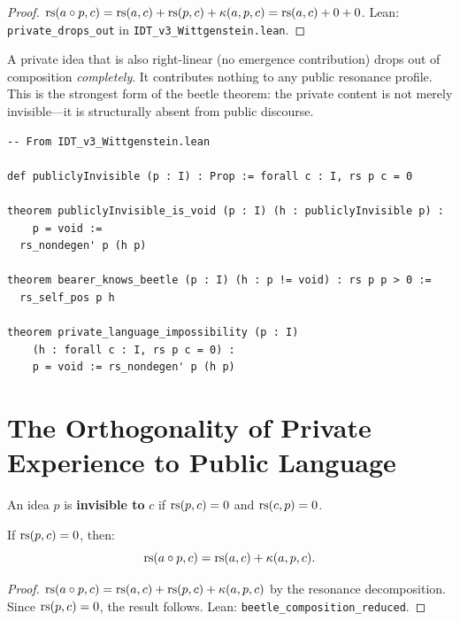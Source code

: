 \begin{proof}
$\mathrm{rs}(a \circ p, c) = \mathrm{rs}(a,c) + \mathrm{rs}(p,c) + \kappa(a,p,c) = \mathrm{rs}(a,c) + 0 + 0$.
Lean: \texttt{private\_drops\_out} in \texttt{IDT\_v3\_Wittgenstein.lean}.
\end{proof}

\begin{interpretation}
A private idea that is also right-linear (no emergence contribution) drops out
of composition \emph{completely}. It contributes nothing to any public resonance
profile. This is the strongest form of the beetle theorem: the private content
is not merely invisible---it is structurally absent from public discourse.
\end{interpretation}

\begin{lstlisting}
-- From IDT_v3_Wittgenstein.lean

def publiclyInvisible (p : I) : Prop := forall c : I, rs p c = 0

theorem publiclyInvisible_is_void (p : I) (h : publiclyInvisible p) :
    p = void :=
  rs_nondegen' p (h p)

theorem bearer_knows_beetle (p : I) (h : p != void) : rs p p > 0 :=
  rs_self_pos p h

theorem private_language_impossibility (p : I)
    (h : forall c : I, rs p c = 0) :
    p = void := rs_nondegen' p (h p)
\end{lstlisting}

\section{The Orthogonality of Private Experience to Public Language}

\begin{definition}
\label{def:invisible-to}
An idea $p$ is \textbf{invisible to} $c$ if $\mathrm{rs}(p,c) = 0$ and $\mathrm{rs}(c,p) = 0$.
\end{definition}

\begin{theorem}
\label{thm:beetle-reduced}
If $\mathrm{rs}(p,c) = 0$, then:
\[
\mathrm{rs}(a \circ p, c) = \mathrm{rs}(a, c) + \kappa(a, p, c).
\]
\end{theorem}

\begin{proof}
$\mathrm{rs}(a \circ p, c) = \mathrm{rs}(a,c) + \mathrm{rs}(p,c) + \kappa(a,p,c)$ by the resonance
decomposition. Since $\mathrm{rs}(p,c) = 0$, the result follows.
Lean: \texttt{beetle\_composition\_reduced}.
\end{proof}

